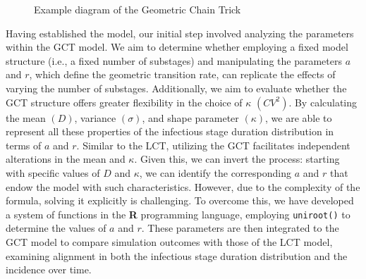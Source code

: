 \documentclass[12pt]{article}
\begin{document}
\begin{figure}[ht]
    \centering
    \caption{Example diagram of the Geometric Chain Trick}
    \label{GCTdiagram}
\end{figure}

Having established the model, our initial step involved analyzing the parameters within the GCT model. We aim to determine whether employing a fixed model structure (i.e., a fixed number of substages) and manipulating the parameters $a$ and $r$, which define the geometric transition rate, can replicate the effects of varying the number of substages. Additionally, we aim to evaluate whether the GCT structure offers greater flexibility in the choice of $\kappa$ $(CV^2)$. By calculating the mean $(D)$, variance $(\sigma)$, and shape parameter $(\kappa)$, we are able to represent all these properties of the infectious stage duration distribution in terms of $a$ and $r$. Similar to the LCT, utilizing the GCT facilitates independent alterations in the mean and $\kappa$. Given this, we can invert the process: starting with specific values of $D$ and $\kappa$, we can identify the corresponding $a$ and $r$ that endow the model with such characteristics. However, due to the complexity of the formula, solving it explicitly is challenging. To overcome this, we have developed a system of functions in the \textbf{R} programming language, employing \verb|uniroot()| to determine the values of $a$ and $r$. These parameters are then integrated to the GCT model to compare simulation outcomes with those of the LCT model, examining alignment in both the infectious stage duration distribution and the incidence over time.
\end{document}
